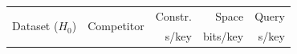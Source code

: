 
\addtolength\tabcolsep{-1.9pt}
\centering

	\begin{tabular}{ll rrr}
		\toprule
        \multirow{2}{*}{Dataset ($H_0$)} & \multirow{2}{*}{Competitor} & Constr. & Space    & Query \\
                                         &                             & \textmu{}s/key  & bits/key & \changed{\textmu{}}s/key  \\

		

\end{tabular}
